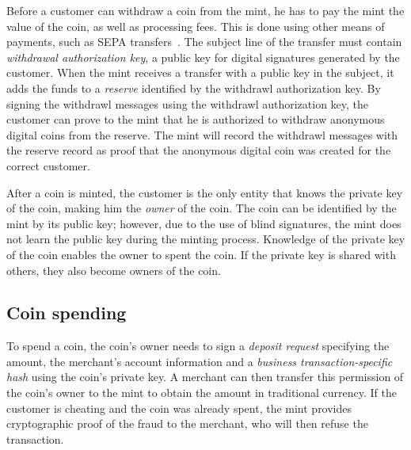 \documentclass{llncs}
\begin{document}
Before a customer can withdraw a coin from the mint, he has to pay the
mint the value of the coin, as well as processing fees.  This is done
using other means of payments, such as SEPA transfers~\cite{sepa}.
The subject line of the transfer must contain {\em withdrawal
  authorization key}, a public key for digital signatures generated by
the customer.  When the mint receives a transfer with a public key in
the subject, it adds the funds to a {\em reserve} identified by the
withdrawl authorization key.  By signing the withdrawl messages using
the withdrawl authorization key, the customer can prove to the mint
that he is authorized to withdraw anonymous digital coins from the
reserve.  The mint will record the withdrawl messages with the reserve
record as proof that the anonymous digital coin was created for the
correct customer.

After a coin is minted, the customer is the only entity that knows the
private key of the coin, making him the \emph{owner} of the coin.  The
coin can be identified by the mint by its public key; however, due to
the use of blind signatures, the mint does not learn the public key
during the minting process.  Knowledge of the private key of the coin
enables the owner to spent the coin.  If the private key is shared
with others, they also become owners of the coin.

\subsection{Coin spending}

To spend a coin, the coin's owner needs to sign a {\em deposit
  request} specifying the amount, the merchant's account information
and a {\em business transaction-specific hash} using the coin's
private key.  A merchant can then transfer this permission of the
coin's owner to the mint to obtain the amount in traditional currency.
If the customer is cheating and the coin was already spent, the mint
provides cryptographic proof of the fraud to the merchant, who will
then refuse the transaction.

\end{document}
